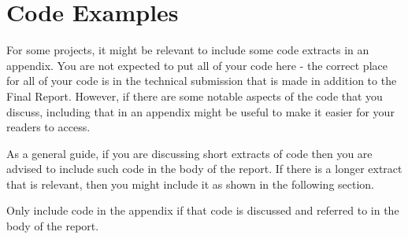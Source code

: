 \chapter{Code Examples}

For some projects, it might be relevant to include some code extracts in an appendix. You
are not expected to put all of your code here - the correct place for all of your code is in the
technical submission that is made in addition to the Final Report. However, if there are some notable
aspects of the code that you discuss, including that in an appendix might be useful to make it easier for your readers to access.

As a general guide, if you are discussing short extracts of code then you are advised to include
such code in the body of the report. If there is a longer extract that is relevant, then you
 might include it as shown in the following section.

Only include code in the appendix if that code is discussed and referred to in the body of the report.
